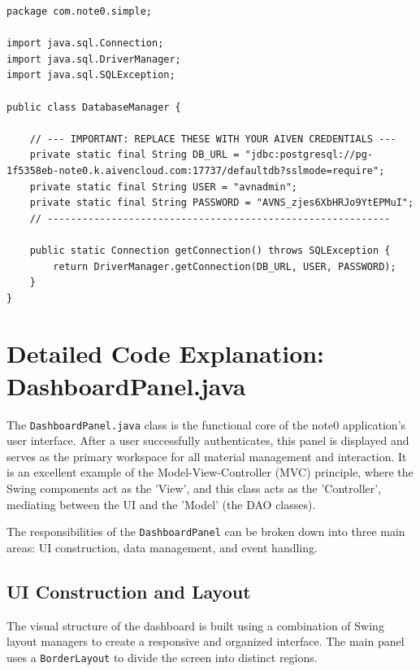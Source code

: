 \documentclass[12pt, a4paper]{report}
\begin{document}
\begin{itemize}
\begin{verbatim}
package com.note0.simple;

import java.sql.Connection;
import java.sql.DriverManager;
import java.sql.SQLException;

public class DatabaseManager {

    // --- IMPORTANT: REPLACE THESE WITH YOUR AIVEN CREDENTIALS ---
    private static final String DB_URL = "jdbc:postgresql://pg-1f5358eb-note0.k.aivencloud.com:17737/defaultdb?sslmode=require";
    private static final String USER = "avnadmin";
    private static final String PASSWORD = "AVNS_zjes6XbHRJo9YtEPMuI";
    // -----------------------------------------------------------

    public static Connection getConnection() throws SQLException {
        return DriverManager.getConnection(DB_URL, USER, PASSWORD);
    }
}
\end{verbatim}


\chapter{Detailed Code Explanation: DashboardPanel.java}

The \texttt{DashboardPanel.java} class is the functional core of the note0 application's user interface. After a user successfully authenticates, this panel is displayed and serves as the primary workspace for all material management and interaction. It is an excellent example of the Model-View-Controller (MVC) principle, where the Swing components act as the 'View', and this class acts as the 'Controller', mediating between the UI and the 'Model' (the DAO classes).

The responsibilities of the \texttt{DashboardPanel} can be broken down into three main areas: UI construction, data management, and event handling.

\section{UI Construction and Layout}
The visual structure of the dashboard is built using a combination of Swing layout managers to create a responsive and organized interface. The main panel uses a \texttt{BorderLayout} to divide the screen into distinct regions.


\end{itemize}
\end{document}
